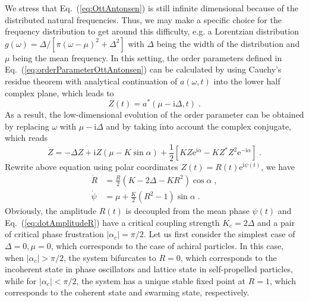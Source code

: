 \documentclass{article}
\begin{document}
We stress that Eq.~(\ref{eq:OttAntonsen}) is still infinite dimensional
because of the distributed natural frequencies. Thus, we may make a specific choice for the frequency distribution to get around this difficulty, e.g. a Lorentzian distribution $g\left(\omega\right)=\varDelta / [ \pi\left(\omega-\mu\right)^2+\varDelta ^2 ]$ with $\varDelta $ being the width of the distribution and $\mu$ being the mean frequency.
In this setting, the order parameters defined in Eq.~(\ref{eq:orderParameterOttAntonsen}) can be calculated by using Cauchy's residue theorem with analytical continuation of $a\left(\omega, t\right)$ into the lower half complex plane, which leads to
\begin{equation}
    Z(t)=a^{*}\left(\mu-\mathrm{i}\varDelta, t\right) \;.
\end{equation}
As a result, the low-dimensional evolution of the order parameter can be obtained by replacing $\omega$ with $\mu-\mathrm{i}\varDelta$ and by taking into account the complex conjugate, which reads
\begin{equation}
    \dot{Z}=-\Delta Z+\mathrm{i}Z\left( \mu -K\sin \alpha \right) +\frac{1}{2}\left[ KZ\mathrm{e}^{\mathrm{i}\alpha}-KZ^*Z^2\mathrm{e}^{-\mathrm{i}\alpha} \right] \;.
    \label{eq:orderParameterEvolution}
\end{equation}
Rewrite above equation using polar coordinates $Z\left( t \right) =R\left( t \right) \mathrm{e}^{\mathrm{i}\psi \left( t \right)}$, we have
\begin{subequations}
    \begin{align}
        \dot{R}&=\frac{R}{2}\left( K-2\varDelta -KR^2 \right) \cos \alpha \;, \label{eq:dotAmplitudeR}\\
        \dot{\psi}&=\mu +\frac{K}{2}\left( R^2-1 \right) \sin \alpha \label{detPsi}\;.
    \end{align}
\end{subequations}
Obviously, the amplitude $R\left( t \right)$ is decoupled from the mean phase $\psi\left( t \right)$ and Eq.~(\ref{eq:dotAmplitudeR}) have a critical coupling strength $K_c=2\varDelta$ and a pair of critical phase frustration $\left|\alpha_c\right| = \pi/2$.
Let us first consider the simplest case of $ \varDelta =0, \mu=0$, which corresponds to the case of achiral particles. In this case, when $\left|\alpha_c\right| > \pi/2$, the system bifurcates to $R=0$, which corresponds to the incoherent state in phase oscillators and lattice state in self-propelled particles, while for $\left|\alpha_c\right| < \pi/2$, the system has a unique stable fixed point at $R=1$, which corresponds to the coherent state and swarming state, respectively.
\end{document}
